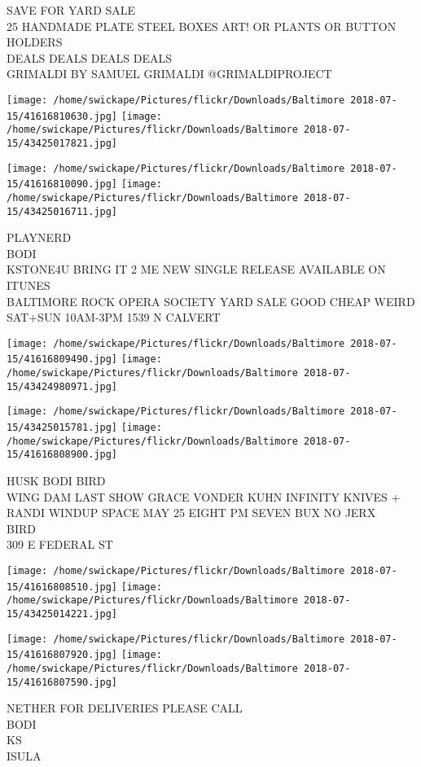 \documentclass[10pt,letterpaper]{article}
\begin{document}
SAVE FOR YARD SALE\\
25 HANDMADE PLATE STEEL BOXES ART!  OR PLANTS OR BUTTON HOLDERS\\
DEALS DEALS DEALS DEALS\\
GRIMALDI BY SAMUEL GRIMALDI @GRIMALDIPROJECT
\pagebreak

\texttt{[image: /home/swickape/Pictures/flickr/Downloads/Baltimore 2018-07-15/41616810630.jpg]}
\texttt{[image: /home/swickape/Pictures/flickr/Downloads/Baltimore 2018-07-15/43425017821.jpg]}

\texttt{[image: /home/swickape/Pictures/flickr/Downloads/Baltimore 2018-07-15/41616810090.jpg]}
\texttt{[image: /home/swickape/Pictures/flickr/Downloads/Baltimore 2018-07-15/43425016711.jpg]}

PLAYNERD\\
BODI\\
KSTONE4U BRING IT 2 ME NEW SINGLE RELEASE AVAILABLE ON ITUNES\\
BALTIMORE ROCK OPERA SOCIETY YARD SALE GOOD CHEAP WEIRD SAT+SUN 10AM{-}3PM 1539 N CALVERT
\pagebreak

\texttt{[image: /home/swickape/Pictures/flickr/Downloads/Baltimore 2018-07-15/41616809490.jpg]}
\texttt{[image: /home/swickape/Pictures/flickr/Downloads/Baltimore 2018-07-15/43424980971.jpg]}

\texttt{[image: /home/swickape/Pictures/flickr/Downloads/Baltimore 2018-07-15/43425015781.jpg]}
\texttt{[image: /home/swickape/Pictures/flickr/Downloads/Baltimore 2018-07-15/41616808900.jpg]}

HUSK BODI BIRD\\
WING DAM LAST SHOW GRACE VONDER KUHN INFINITY KNIVES + RANDI WINDUP SPACE MAY 25 EIGHT PM SEVEN BUX NO JERX\\
BIRD\\
309 E FEDERAL ST
\pagebreak

\texttt{[image: /home/swickape/Pictures/flickr/Downloads/Baltimore 2018-07-15/41616808510.jpg]}
\texttt{[image: /home/swickape/Pictures/flickr/Downloads/Baltimore 2018-07-15/43425014221.jpg]}

\texttt{[image: /home/swickape/Pictures/flickr/Downloads/Baltimore 2018-07-15/41616807920.jpg]}
\texttt{[image: /home/swickape/Pictures/flickr/Downloads/Baltimore 2018-07-15/41616807590.jpg]}

NETHER FOR DELIVERIES PLEASE CALL\\
BODI\\
KS\\
ISULA
\pagebreak
\end{document}
